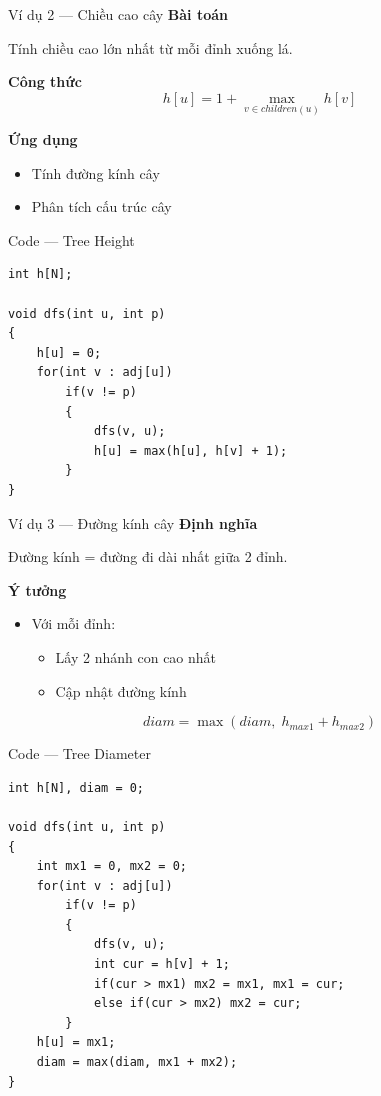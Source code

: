 \documentclass[aspectratio=169]{beamer}
\begin{document}
\begin{frame}{Ví dụ 2 — Chiều cao cây}
\textbf{Bài toán}

Tính chiều cao lớn nhất từ mỗi đỉnh xuống lá.

\vspace{6pt}
\textbf{Công thức}
\[
h[u] = 1 + \max_{v \in children(u)} h[v]
\]

\vspace{6pt}
\textbf{Ứng dụng}
\begin{itemize}
    \item Tính đường kính cây
    \item Phân tích cấu trúc cây
\end{itemize}
\end{frame}

\begin{frame}[fragile]{Code — Tree Height}
\small
\begin{verbatim}
int h[N];

void dfs(int u, int p)
{
    h[u] = 0;
    for(int v : adj[u])
        if(v != p)
        {
            dfs(v, u);
            h[u] = max(h[u], h[v] + 1);
        }
}
\end{verbatim}
\end{frame}

\begin{frame}{Ví dụ 3 — Đường kính cây}
\textbf{Định nghĩa}

Đường kính = đường đi dài nhất giữa 2 đỉnh.

\vspace{6pt}
\textbf{Ý tưởng}
\begin{itemize}
    \item Với mỗi đỉnh:
    \begin{itemize}
        \item Lấy 2 nhánh con cao nhất
        \item Cập nhật đường kính
    \end{itemize}
\end{itemize}

\[
diam = \max(diam,\; h_{max1} + h_{max2})
\]
\end{frame}

\begin{frame}[fragile]{Code — Tree Diameter}
\small
\begin{verbatim}
int h[N], diam = 0;

void dfs(int u, int p)
{
    int mx1 = 0, mx2 = 0;
    for(int v : adj[u])
        if(v != p)
        {
            dfs(v, u);
            int cur = h[v] + 1;
            if(cur > mx1) mx2 = mx1, mx1 = cur;
            else if(cur > mx2) mx2 = cur;
        }
    h[u] = mx1;
    diam = max(diam, mx1 + mx2);
}
\end{verbatim}
\end{frame}
\end{document}

